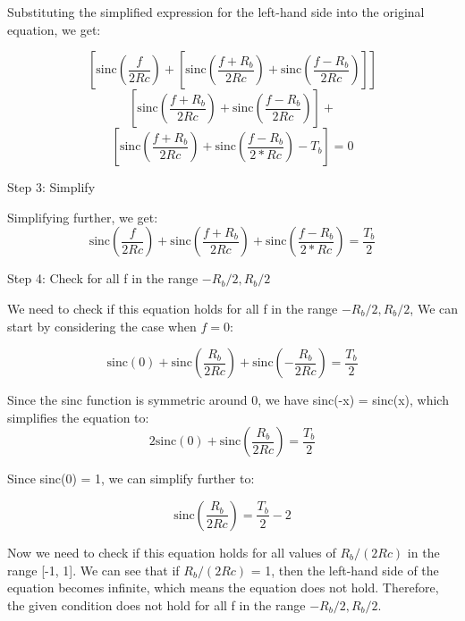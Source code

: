 \documentclass[14pt,a4paper]{report}
\begin{document}
\begin{answer_box*}
Substituting the simplified expression for the left-hand side into the original equation, we get:

    $$\left[\text{sinc}\left(\frac{f }{2Rc}\right) + \left[\text{sinc}\left(\frac{f +R_b }{2Rc}\right) + \text{sinc}\left(\frac{f -R_b }{2Rc}\right)\right]\right] $$    
    $$\left[\text{sinc}\left(\frac{f +R_b }{2Rc}\right) + \text{sinc}\left(\frac{f -R_b }{2Rc}\right)\right] + $$
    $$\left[\text{sinc}\left(\frac{f + R_b }{2Rc}\right) + \text{sinc}\left(\frac{f - R_b }{2*Rc}\right) - T_b \right] = 0$$

Step 3: Simplify

Simplifying further, we get:
\begin{equation}
    \text{sinc}\left(\frac{f }{2Rc}\right) + \text{sinc}\left(\frac{f + R_b }{2Rc}\right) + \text{sinc}\left(\frac{f - R_b }{2*Rc}\right) = \frac{T_b }{2}
\end{equation}

Step 4: Check for all f in the range $-R_b /2, R_b /2$

We need to check if this equation holds for all f in the range $-R_b /2, R_b /2$, We can start by considering the case when $f = 0:$

\begin{equation}
    \text{sinc}(0) + \text{sinc}\left(\frac{R_b }{2Rc}\right) + \text{sinc}\left(-\frac{R_b }{2Rc}\right) = \frac{T_b }{2}
\end{equation}


Since the sinc function is symmetric around 0, we have sinc(-x) = sinc(x), which simplifies the equation to:
\begin{equation}
    2\text{sinc}(0) + \text{sinc}\left(\frac{R_b }{2Rc}\right) = \frac{T_b }{2}
\end{equation}

Since sinc(0) = 1, we can simplify further to:

\begin{equation}
    \text{sinc}\left(\frac{R_b }{2Rc}\right) = \frac{T_b }{2} - 2
\end{equation}

Now we need to check if this equation holds for all values of $R_b /(2Rc)$ in the range [-1, 1]. We can see that if $R_b /(2Rc)$ = 1, then the left-hand side of the equation becomes infinite, which means the equation does not hold. Therefore, the given condition does not hold for all f in the range $-R_b /2, R_b /2$.

\end{answer_box*}
\end{document}
